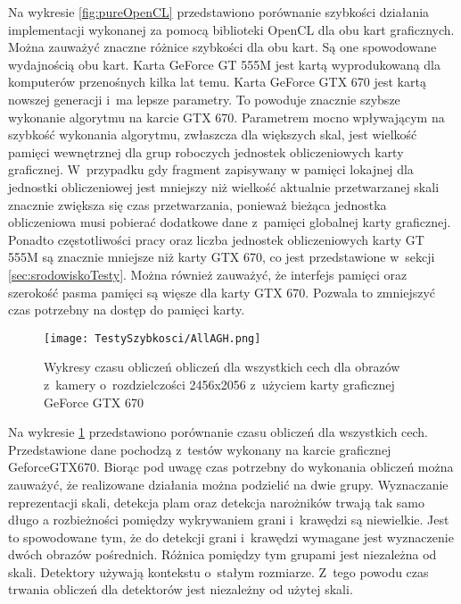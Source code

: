 Na wykresie \ref{fig:pureOpenCL} przedstawiono porównanie szybkości działania implementacji wykonanej za pomocą biblioteki OpenCL dla obu kart graficznych. Można zauważyć znaczne różnice szybkości dla obu kart. Są one spowodowane wydajnością obu kart. Karta GeForce GT 555M jest kartą wyprodukowaną dla komputerów przenośnych kilka lat temu. Karta GeForce GTX 670 jest kartą nowszej generacji i~ma lepsze parametry. To powoduje znacznie szybsze wykonanie algorytmu na karcie GTX 670. Parametrem mocno wpływającym na szybkość wykonania algorytmu, zwłaszcza dla większych skal, jest wielkość pamięci wewnętrznej dla grup roboczych jednostek obliczeniowych karty graficznej. W~przypadku gdy fragment zapisywany w pamięci lokajnej dla jednostki obliczeniowej jest mniejszy niż wielkość aktualnie przetwarzanej skali znacznie zwiększa się czas przetwarzania, ponieważ bieżąca jednostka obliczeniowa musi pobierać dodatkowe dane z~pamięci globalnej karty graficznej. Ponadto częstotliwości pracy oraz liczba jednostek obliczeniowych karty GT 555M są znacznie mniejsze niż karty GTX 670, co jest przedstawione w~sekcji \ref{sec:srodowiskoTesty}. Można również zauważyć, że interfejs pamięci oraz szerokość pasma pamięci są więsze dla karty GTX 670. Pozwala to zmniejszyć czas potrzebny na dostęp do pamięci karty.

\begin{figure}[h]
\begin{center}
\texttt{[image: TestySzybkosci/AllAGH.png]}
\end{center}
\caption{Wykresy czasu obliczeń obliczeń dla wszystkich cech dla obrazów z~kamery o~rozdzielczości 2456x2056 z~użyciem karty graficznej GeForce GTX 670}
\label{fig:AllAGH}
\end{figure}

Na wykresie \ref{fig:AllAGH} przedstawiono porównanie czasu obliczeń dla wszystkich cech. Przedstawione dane pochodzą z~testów wykonany na karcie graficznej GeforceGTX670. Biorąc pod uwagę czas potrzebny do wykonania obliczeń można zauważyć, że realizowane działania można podzielić na dwie grupy. Wyznaczanie reprezentacji skali, detekcja plam oraz detekcja narożników trwają tak samo długo a rozbieżności pomiędzy wykrywaniem grani i~krawędzi są niewielkie. Jest to spowodowane tym, że do detekcji grani i~krawędzi wymagane jest wyznaczenie dwóch obrazów pośrednich. Różnica pomiędzy tym grupami jest niezależna od skali. Detektory używają kontekstu o~stałym rozmiarze. Z~tego powodu czas trwania obliczeń dla detektorów jest niezależny od użytej skali.

